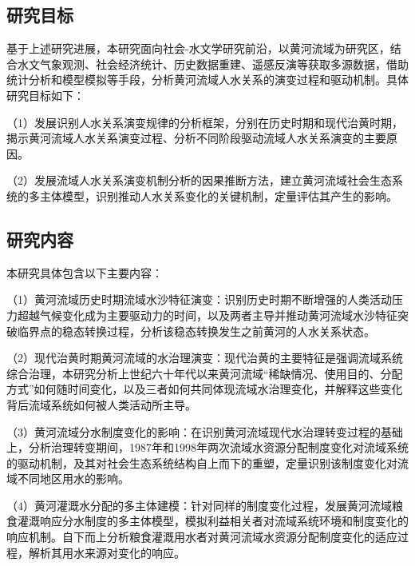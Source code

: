 
\subsection{研究目标}
基于上述研究进展，本研究面向社会-水文学研究前沿，以黄河流域为研究区，结合水文气象观测、社会经济统计、历史数据重建、遥感反演等获取多源数据，借助统计分析和模型模拟等手段，分析黄河流域人\textendash{}水关系的演变过程和驱动机制。具体研究目标如下：

（1）发展识别人\textendash{}水关系演变规律的分析框架，分别在历史时期和现代治黄时期，揭示黄河流域人\textendash{}水关系演变过程、分析不同阶段驱动流域人\textendash{}水关系演变的主要原因。

（2）发展流域人\textendash{}水关系演变机制分析的因果推断方法，建立黄河流域社会\textendash{}生态系统的多主体模型，识别推动人\textendash{}水关系变化的关键机制，定量评估其产生的影响。


\subsection{研究内容}

本研究具体包含以下主要内容：

（1）黄河流域历史时期流域水沙特征演变：识别历史时期不断增强的人类活动压力超越气候变化成为主要驱动力的时间，以及两者主导并推动黄河流域水沙特征突破临界点的稳态转换过程，分析该稳态转换发生之前黄河的人\textendash{}水关系状态。

（2）现代治黄时期黄河流域的水治理演变：现代治黄的主要特征是强调流域系统综合治理，本研究分析上世纪六十年代以来黄河流域“稀缺情况、使用目的、分配方式”如何随时间变化，以及三者如何共同体现流域水治理变化，并解释这些变化背后流域系统如何被人类活动所主导。

（3）黄河流域分水制度变化的影响：在识别黄河流域现代水治理转变过程的基础上，分析治理转变期间，1987年和1998年两次流域水资源分配制度变化对流域系统的驱动机制，及其对社会\textendash{}生态系统结构自上而下的重塑，定量识别该制度变化对流域不同地区用水的影响。

（4）黄河灌溉水分配的多主体建模：针对同样的制度变化过程，发展黄河流域粮食灌溉响应分水制度的多主体模型，模拟利益相关者对流域系统环境和制度变化的响应机制。自下而上分析粮食灌溉用水者对黄河流域水资源分配制度变化的适应过程，解析其用水来源对变化的响应。

